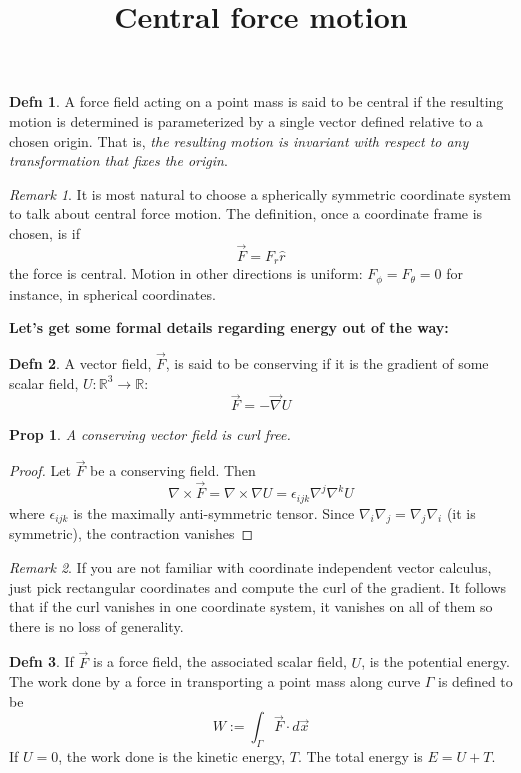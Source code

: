 \documentclass{article}
\title{Central force motion}
\newtheorem*{proposition}{Prop}
\theoremstyle{definition}
\newtheorem*{definition}{Defn}
\theoremstyle{remark}
\newtheorem*{remark}{Remark}
\begin{document}
\maketitle


\begin{definition}
  A force field acting on a point mass is said to be central if the resulting motion is determined is parameterized by a single vector defined relative to a chosen origin. That is, \emph{the resulting motion is invariant with respect to any transformation that fixes the origin}.
\end{definition}

\begin{remark}
  It is most natural to choose a spherically symmetric coordinate system to talk about central force motion. The definition, once a coordinate frame is chosen, is if
$$
\vec F = F_r\hat r
$$
the force is central. Motion in other directions is uniform: $F_\phi=F_\theta=0$ for instance, in spherical coordinates. 
\end{remark}

\textbf{Let's get some formal details regarding energy out of the way:}

\begin{definition}
  A vector field, $\vec F$, is said to be conserving if it is the gradient of some scalar field, $U:\mathbb R^3\to\mathbb{R}$:
$$
\vec F = -\vec\nabla U
$$
\end{definition}



\begin{proposition}
  A conserving vector field is curl free.
\end{proposition}

\begin{proof}
  Let $\vec F$ be a conserving field. Then
$$
\nabla \times \vec F = \nabla \times \nabla U=\epsilon_{ijk}\nabla^j\nabla^k U 
$$
where $\epsilon_{ijk}$ is the maximally anti-symmetric tensor. Since $\nabla_i\nabla_j=\nabla_j\nabla_i$ (it is symmetric), the contraction vanishes 
\end{proof}
\begin{remark}
  If you are not familiar with coordinate independent vector calculus, just pick rectangular coordinates and compute the curl of the gradient. It follows that if the curl vanishes in one coordinate system, it vanishes on all of them so there is no loss of generality.
\end{remark}

\begin{definition}
  If $\vec F$ is a force field, the associated scalar field, $U$, is the potential energy. The work done by a force in transporting a point mass along curve $\Gamma$ is defined to be
$$
W:=\int_\Gamma \vec F\cdot d\vec x
$$
If $U=0$, the work done is the kinetic energy, $T$. The total energy is $E=U+T$.
\end{definition}
\end{document}
